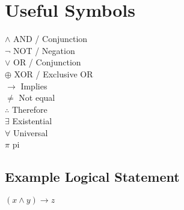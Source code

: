 \documentclass{article}
\begin{document}
\section*{Useful Symbols}
$\land$ AND / Conjunction\\
$\neg$ NOT / Negation\\
$\lor$ OR / Conjunction\\
$\oplus$ XOR / Exclusive OR\\
$\to$ Implies\\
$\neq$ Not equal\\
$\therefore$ Therefore\\
$\exists$ Existential\\
$\forall$ Universal\\
$\pi$ pi

\subsection*{Example Logical Statement}

$(x \land y) \to z$
\end{document}

